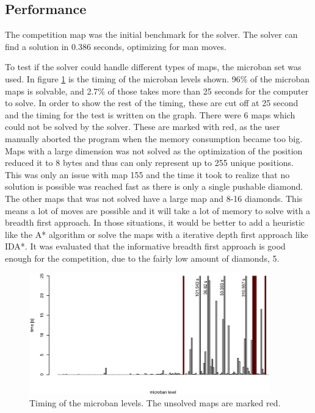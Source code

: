 \subsection{Performance}
The competition map was the initial benchmark for the solver.
The solver can find a solution in 0.386 seconds, optimizing for man moves.

To test if the solver could handle different types of maps, the microban set was used.
In figure \ref{fig:microban_timing} is the timing of the microban levels shown.
96\% of the microban maps is solvable, and 2.7\% of those takes more than 25 seconds for the computer to solve.
In order to show the rest of the timing, these are cut off at 25 second and the timing for the test is written on the graph.
There were 6 maps which could not be solved by the solver. These are marked with red, as the user manually aborted the program when the memory consumption became too big.
Maps with a large dimension was not solved as the optimization of the position reduced it to 8 bytes and thus can only represent up to 255 unique positions.
This was only an issue with map 155 and the time it took to realize that no solution is possible was reached fast as there is only a single pushable diamond.
The other maps that was not solved have a large map and 8-16 diamonds. 
This means a lot of moves are possible and it will take a lot of memory to solve with a breadth first approach.
In those situations, it would be better to add a heuristic like the A* algorithm or solve the maps with a iterative depth first approach like IDA*.
It was evaluated that the informative breadth first approach is good enough for the competition, due to the fairly low amount of diamonds, 5.

\begin{figure}[h]
 \centering
 \includegraphics[width=0.93\textwidth]{img/micoban_timing.eps}
 \caption{Timing of the microban levels. The unsolved maps are marked red.}
 \label{fig:microban_timing}
\end{figure}
